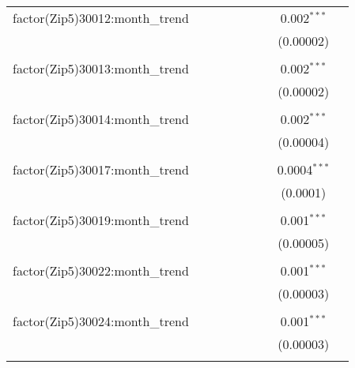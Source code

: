 \begin{table}[H]
{\begin{tabular}{@{\extracolsep{5pt}}lcccccccc}
  factor(Zip5)30012:month\_trend &  &  &  &  &  &  & 0.002$^{***}$ &  \\  

   &  &  &  &  &  &  & (0.00002) &  \\  

   & & & & & & & & \\  

  factor(Zip5)30013:month\_trend &  &  &  &  &  &  & 0.002$^{***}$ &  \\  

   &  &  &  &  &  &  & (0.00002) &  \\  

   & & & & & & & & \\  

  factor(Zip5)30014:month\_trend &  &  &  &  &  &  & 0.002$^{***}$ &  \\  

   &  &  &  &  &  &  & (0.00004) &  \\  

   & & & & & & & & \\  

  factor(Zip5)30017:month\_trend &  &  &  &  &  &  & 0.0004$^{***}$ &  \\  

   &  &  &  &  &  &  & (0.0001) &  \\  

   & & & & & & & & \\  

  factor(Zip5)30019:month\_trend &  &  &  &  &  &  & 0.001$^{***}$ &  \\  

   &  &  &  &  &  &  & (0.00005) &  \\  

   & & & & & & & & \\  

  factor(Zip5)30022:month\_trend &  &  &  &  &  &  & 0.001$^{***}$ &  \\  

   &  &  &  &  &  &  & (0.00003) &  \\  

   & & & & & & & & \\  

  factor(Zip5)30024:month\_trend &  &  &  &  &  &  & 0.001$^{***}$ &  \\  

   &  &  &  &  &  &  & (0.00003) &  \\  

   & & & & & & & & \\  


\end{tabular}}
\end{table}
